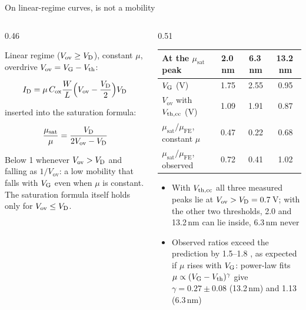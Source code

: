 \begin{frame}[t]{On linear-regime curves, \twoMusat{} is not a mobility}
  \twoTop
  \begin{columns}[T,onlytextwidth]
    \begin{column}{0.46\textwidth}
      {\footnotesize Linear regime ($V_\mathrm{ov} \ge V_{\mathrm{D}}$), constant $\mu$, overdrive $V_\mathrm{ov} = V_{\mathrm{G}} - V_{\mathrm{th}}$:\par}
      \vspace{-2mm}
      \[ I_{\mathrm{D}} = \mu\,C_\mathrm{ox}\frac{W}{L}\Big(V_\mathrm{ov} - \frac{V_{\mathrm{D}}}{2}\Big)V_{\mathrm{D}} \]
      {\footnotesize inserted into the saturation formula:\par}
      \vspace{-2mm}
      \[ \frac{\mu_\mathrm{sat}}{\mu} = \frac{V_{\mathrm{D}}}{2V_\mathrm{ov} - V_{\mathrm{D}}} \]
      {\footnotesize Below 1 whenever $V_\mathrm{ov} > V_{\mathrm{D}}$ and falling as $1/V_\mathrm{ov}$: a low mobility that falls
        with $V_{\mathrm{G}}$ even when $\mu$ is constant. The saturation formula itself holds only for $V_\mathrm{ov} \le V_{\mathrm{D}}$.
        \par}
    \end{column}
    \begin{column}{0.51\textwidth}
      {\footnotesize
      \setlength{\tabcolsep}{4pt}
      \begin{tabular}{@{}lccc@{}}
        \toprule
        At the $\mu_\mathrm{sat}$ peak & 2.0\,nm & 6.3\,nm & 13.2\,nm \\
        \midrule
        $V_{\mathrm{G}}$ (V) & 1.75 & 2.55 & 0.95 \\
        $V_\mathrm{ov}$ with $V_{\mathrm{th,cc}}$ (V) & 1.09 & 1.91 & 0.87 \\
        $\mu_\mathrm{sat}/\mu_\mathrm{FE}$, constant $\mu$ & 0.47 & 0.22 & 0.68 \\
        $\mu_\mathrm{sat}/\mu_\mathrm{FE}$, observed & 0.72 & 0.41 & 1.02 \\
        \bottomrule
      \end{tabular}\par}
      \begin{itemize}\footnotesize
        \item With $V_{\mathrm{th,cc}}$ all three measured peaks lie at $V_\mathrm{ov} > V_{\mathrm{D}} = 0.7$\,V; with
          the other two thresholds, 2.0 and 13.2\,nm can lie inside, 6.3\,nm never 
        \item Observed ratios exceed the prediction by 1.5--1.8 , as expected if $\mu$ rises with
          $V_{\mathrm{G}}$: power-law fits $\mu \propto (V_{\mathrm{G}} - V_{\mathrm{th}})^{\gamma}$ give $\gamma = 0.27\pm0.08$ (13.2\,nm) and 1.13
          (6.3\,nm) 
      \end{itemize}
    \end{column}
  \end{columns}
\end{frame}
